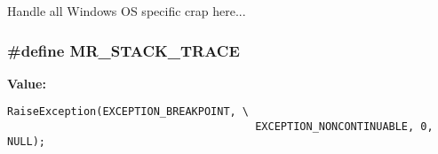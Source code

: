 Handle all Windows OS specific crap here... 
\subsubsection{\setlength{\rightskip}{0pt plus 5cm}\#define MR\_\-STACK\_\-TRACE}\label{mrWin32_8h_a3}


{\bf Value:}

\footnotesize\begin{verbatim}RaiseException(EXCEPTION_BREAKPOINT, \
                                       EXCEPTION_NONCONTINUABLE, 0, NULL);
\end{verbatim}\normalsize 
